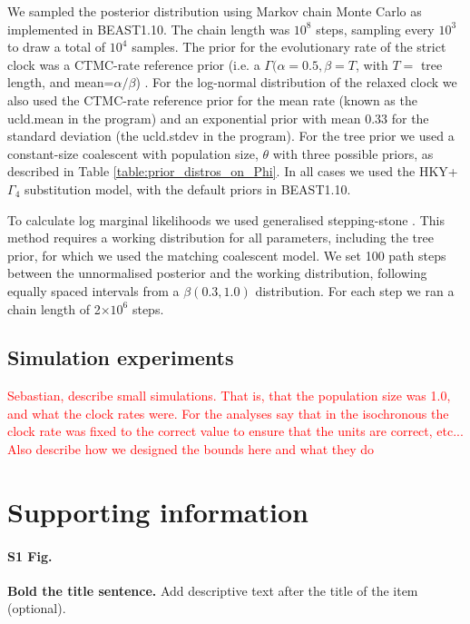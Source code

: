 \documentclass[10pt,letterpaper]{article}
\begin{document}
We sampled the posterior distribution using Markov chain Monte Carlo as implemented in BEAST1.10. The chain length was $10^{8}$ steps, sampling every $10^3$ to draw a total of $10^4$ samples. The prior for the evolutionary rate of the strict clock was a CTMC-rate reference prior (i.e. a $\Gamma(\alpha=0.5, \beta=T$, with $T=$ tree length, and mean=$\alpha/\beta$) \cite{ferreira2008bayesian}. For the log-normal distribution of the relaxed clock we also used the CTMC-rate reference prior for the mean rate (known as the ucld.mean in the program) and an exponential prior with mean 0.33 for the standard deviation (the ucld.stdev in the program). For the tree prior we used a constant-size coalescent with population size, $\theta$ with three possible priors, as described in Table \ref{table:prior_distros_on_Phi}. In all cases we used the HKY+$\Gamma_4$ substitution model, with the default priors in BEAST1.10.

To calculate log marginal likelihoods we used generalised stepping-stone \cite{baele2016genealogical,fan2011choosing}. This method requires a working distribution for all parameters, including the tree prior, for which we used the matching coalescent model. We set 100 path steps between the unnormalised posterior and the working distribution, following equally spaced intervals from a $\beta(0.3, 1.0)$ distribution. For each step we ran a chain length of 2$\times 10^{6}$ steps.

\subsection*{Simulation experiments}
\textcolor{red}{Sebastian, describe small simulations. That is, that the population size was 1.0, and what the clock rates were. For the analyses say that in the isochronous the clock rate was fixed to the correct value to ensure that the units are correct, etc... Also describe how we designed the bounds here and what they do}




\section*{Supporting information}

\paragraph*{S1 Fig.}
\label{S1_Fig}
{\bf Bold the title sentence.} Add descriptive text after the title of the item (optional).
\end{document}
